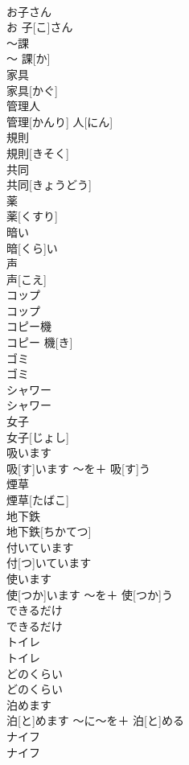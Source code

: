 \documentclass[8pt]{extreport}
\begin{document}
\begin{CJK}{UTF8}{min}
\\	お子さん	
\\	お 子[こ]さん		
\\	〜課	
\\	〜 課[か]		
\\	家具	
\\	家具[かぐ]		
\\	管理人	
\\	管理[かんり] 人[にん]		
\\	規則	
\\	規則[きそく]		
\\	共同	
\\	共同[きょうどう]		
\\	薬	
\\	薬[くすり]		
\\	暗い	
\\	暗[くら]い		
\\	声	
\\	声[こえ]		
\\	コップ	
\\	コップ		
\\	コピー機	
\\	コピー 機[き]		
\\	ゴミ	
\\	ゴミ		
\\	シャワー	
\\	シャワー		
\\	女子	
\\	女子[じょし]		
\\	吸います	
\\	吸[す]います	〜を＋ 吸[す]う	
\\	煙草	
\\	煙草[たばこ]		
\\	地下鉄	
\\	地下鉄[ちかてつ]		
\\	付いています	
\\	付[つ]いています		
\\	使います	
\\	使[つか]います	〜を＋ 使[つか]う	
\\	できるだけ	
\\	できるだけ		
\\	トイレ	
\\	トイレ		
\\	どのくらい	
\\	どのくらい		
\\	泊めます	
\\	泊[と]めます	〜に〜を＋ 泊[と]める	
\\	ナイフ	
\\	ナイフ		

\end{CJK}
\end{document}
